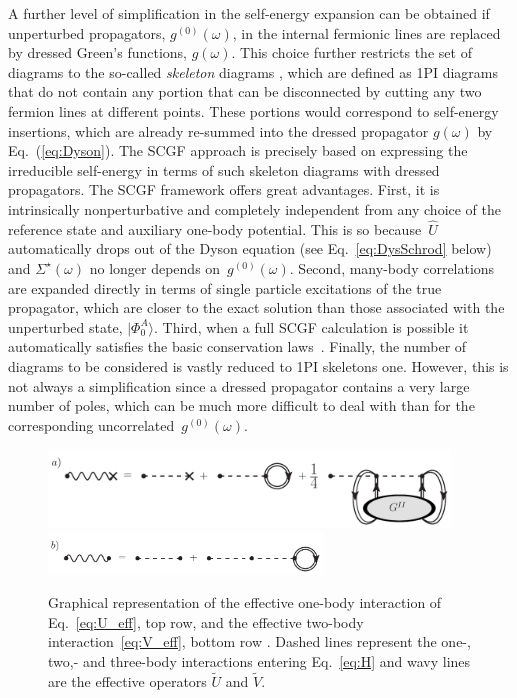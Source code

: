A further level of simplification in the self-energy expansion 
can be obtained if unperturbed propagators, $g^{(0)}(\omega)$, in the internal fermionic lines are replaced by dressed Green's functions, $g(\omega)$. 
This choice further restricts the set of diagrams to the so-called \emph{skeleton} diagrams \cite{ch11_Dickhoff2008}, which are
defined as 1PI diagrams that do not contain  any portion that can be disconnected by cutting any two fermion lines at different points. 
These portions would correspond to self-energy insertions, which are already re-summed into the dressed propagator $g(\omega)$ by Eq.~(\ref{eq:Dyson}).
The SCGF approach is precisely based on expressing the irreducible self-energy in terms of such skeleton diagrams 
with dressed propagators.
%
The SCGF framework offers great advantages. First, it is intrinsically nonperturbative and completely
independent from any choice of the reference state and auxiliary one-body potential. This is so because~$\widehat{U}$
automatically drops out of the Dyson equation (see Eq.~\eqref{eq:DysSchrod} below) and  $\Sigma^\star(\omega)$ no longer
depends on~$g^{(0)}(\omega)$.
Second, many-body correlations are expanded directly in terms of single particle excitations of the true propagator, which are closer
to the exact solution than those associated with the unperturbed state, $\vert\Phi_0^A\rangle$. 
Third, when a full SCGF calculation is possible it automatically satisfies the basic conservation laws~\cite{ch11_Baym1961,ch11_Baym1962,ch11_Dickhoff2008}. 
%
Finally, the number of diagrams to be considered is vastly reduced to 1PI skeletons one. However, this is not always a simplification since a dressed propagator contains a very large number of poles, which can be much more difficult to deal with than for  the corresponding uncorrelated~$g^{(0)}(\omega)$.

\begin{figure}[t]
\begin{center}
\includegraphics[width=0.95\textwidth]{Chapter11-figures/fig11_2_a.pdf}   
\vskip  0.4cm
\includegraphics[width=0.65\textwidth]{Chapter11-figures/fig11_2_b.pdf}  \hspace{0.30\textwidth} 
\caption{Graphical representation of the effective one-body interaction of Eq.~\eqref{eq:U_eff}, top row, and the effective two-body interaction~\eqref{eq:V_eff}, bottom row . Dashed lines represent the
one-, two,- and three-body interactions entering Eq.~\eqref{eq:H} and wavy lines are the effective operators $\widetilde U$ and  $\widetilde V$.}
\label{fig:EffOps}
\end{center}
\end{figure}


